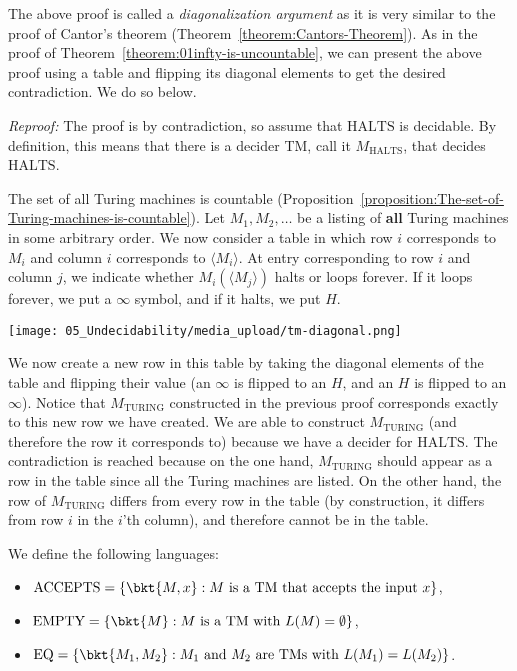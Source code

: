 \begin{note}
\label{note:Diagonalization-argument-for-undecidability}
The above proof is called a \emph{diagonalization argument} as it is very similar to the proof of Cantor's theorem (Theorem~\ref{theorem:Cantors-Theorem}). As in the proof of Theorem~\ref{theorem:01infty-is-uncountable}, we can present the above proof using a table and flipping its diagonal elements to get the desired contradiction. We do so below.

\emph{Reproof:} The proof is by contradiction, so assume that $\text{HALTS}$ is decidable. By definition, this means that there is a decider TM, call it $M_\text{HALTS}$, that decides $\text{HALTS}$.

The set of all Turing machines is countable (Proposition~\ref{proposition:The-set-of-Turing-machines-is-countable}). Let $M_1, M_2, \ldots$ be a listing of {\bf all} Turing machines in some arbitrary order. We now consider a table in which row $i$ corresponds to $M_i$ and column $i$ corresponds to $\langle M_i \rangle$. At entry corresponding to row $i$ and column $j$, we indicate whether $M_i(\langle M_j \rangle)$ halts or loops forever. If it loops forever, we put a $\infty$ symbol, and if it halts, we put $H$.
\begin{center}
\texttt{[image: 05\_Undecidability/media\_upload/tm-diagonal.png]}
\end{center}
We now create a new row in this table by taking the diagonal elements of the table and flipping their value (an $\infty$ is flipped to an $H$, and an $H$ is flipped to an $\infty$). Notice that $M_\text{TURING}$ constructed in the previous proof corresponds exactly to this new row we have created. We are able to construct $M_\text{TURING}$ (and therefore the row it corresponds to) because we have a decider for $\text{HALTS}$. The contradiction is reached because on the one hand, $M_\text{TURING}$ should appear as a row in the table since all the Turing machines are listed. On the other hand, the row of $M_\text{TURING}$ differs from every row in the table (by construction, it differs from row $i$ in the $i$'th column), and therefore cannot be in the table.

\end{note}

\begin{definition}
\label{definition:Languages-related-to-encodings-of-TMs}
We define the following languages:
\begin{itemize}
    \item[] $\text{ACCEPTS} = \{\bkt{M,x} : \text{$M$ is a TM that accepts the input $x$}\}$,
    \item[] $\text{EMPTY} = \{\bkt{M} : \text{$M$ is a TM with $L(M) = \emptyset$} \}$,
    \item[] $\text{EQ} = \{\bkt{M_1,M_2} : \text{$M_1$ and $M_2$ are TMs with $L(M_1) = L(M_2)$} \}$.
\end{itemize}

\end{definition}

